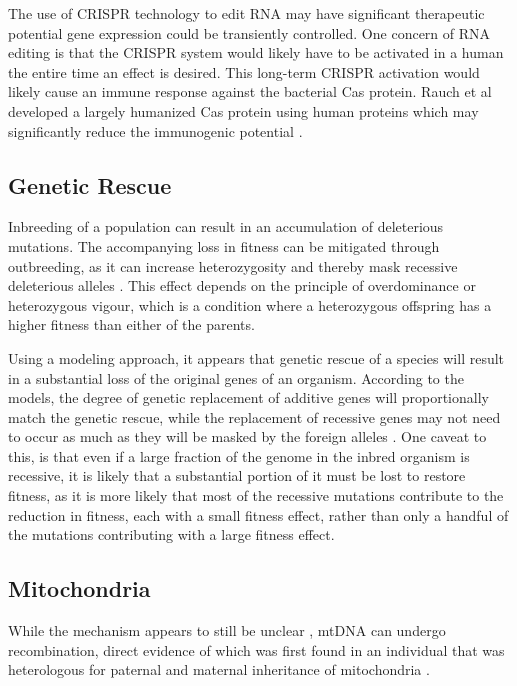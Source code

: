 \documentclass[]{book}
\begin{document}
The use of CRISPR technology to edit RNA may have significant
therapeutic potential gene expression could be transiently controlled.
One concern of RNA editing is that the CRISPR system would likely have
to be activated in a human the entire time an effect is desired. This
long-term CRISPR activation would likely cause an immune response
against the bacterial Cas protein. Rauch et al developed a largely
humanized Cas protein using human proteins which may significantly
reduce the immunogenic potential \citep{rauch2019programmable}.

\subsection{Genetic Rescue}\label{genetic-rescue}

Inbreeding of a population can result in an accumulation of deleterious
mutations. The accompanying loss in fitness can be mitigated through
outbreeding, as it can increase heterozygosity and thereby mask
recessive deleterious alleles
\citep{keller2002inbreeding, ingvarsson2001restoration, vila2003rescue}.
This effect depends on the principle of overdominance or heterozygous
vigour, which is a condition where a heterozygous offspring has a higher
fitness than either of the parents.

Using a modeling approach, it appears that genetic rescue of a species
will result in a substantial loss of the original genes of an organism.
According to the models, the degree of genetic replacement of additive
genes will proportionally match the genetic rescue, while the
replacement of recessive genes may not need to occur as much as they
will be masked by the foreign alleles \citep{Harris2019-sm}. One caveat
to this, is that even if a large fraction of the genome in the inbred
organism is recessive, it is likely that a substantial portion of it
must be lost to restore fitness, as it is more likely that most of the
recessive mutations contribute to the reduction in fitness, each with a
small fitness effect, rather than only a handful of the mutations
contributing with a large fitness effect.

\subsection{Mitochondria}\label{mitochondria}

While the mechanism appears to still be unclear
\citep{chen2013mechanism}, mtDNA can undergo recombination, direct
evidence of which was first found in an individual that was heterologous
for paternal and maternal inheritance of mitochondria
\citep{kraytsberg2004recombination}.
\end{document}
